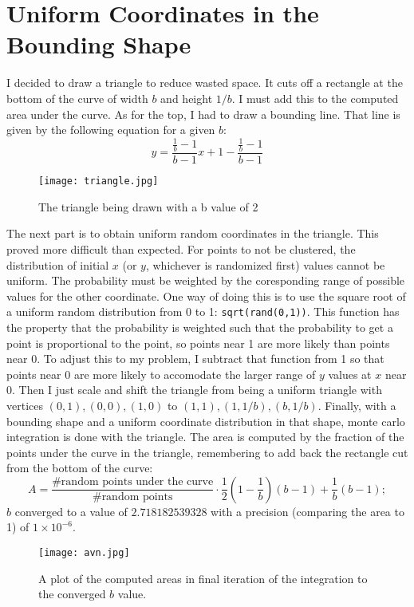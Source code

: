 \documentclass{article}
\begin{document}
\section*{Uniform Coordinates in the Bounding Shape}
I decided to draw a triangle to reduce wasted space. It cuts off a rectangle at the bottom of the curve of width $b$ and height $1/b$. I must add this to the computed area under the curve.
As for the top, I had to draw a bounding line. That line is given by the following equation for a given $b$:\begin{equation}
    y=\frac{\frac{1}{b}-1}{b-1}x+1-\frac{\frac{1}{b}-1}{b-1}
\end{equation}
\begin{figure}[H]
    \centering
    \texttt{[image: triangle.jpg]}
    \caption{The triangle being drawn with a b value of 2}
\end{figure}
The next part is to obtain uniform random coordinates in the triangle. This proved more difficult than expected. For points to not be clustered, the distribution of initial $x$ (or $y$, whichever is randomized first) values cannot be uniform. The probability must be weighted by the coresponding range of possible values for the other coordinate. One way of doing this is to use the square root of a uniform random distribution from 0 to 1: \verb+sqrt(rand(0,1))+. This function has the property that the probability is weighted such that the probability to get a point is proportional to the point, so points near 1 are more likely than points near 0. To adjust this to my problem, I subtract that function from 1 so that points near 0 are more likely to accomodate the larger range of $y$ values at $x$ near 0. Then I just scale and shift the triangle from being a uniform triangle with vertices $(0,1),(0,0),(1,0)$ to $(1,1),(1,1/b),(b,1/b)$. Finally, with a bounding shape and a uniform coordinate distribution in that shape, monte carlo integration is done with the triangle. The area is computed by the fraction of the points under the curve in the triangle, remembering to add back the rectangle cut from the bottom of the curve:\begin{equation}
    A=\frac{\text{\# random points under the curve}}{\text{\# random points}}\cdot \frac{1}{2}(1-\frac{1}{b})(b-1)+\frac{1}{b}(b-1);
\end{equation}
$b$ converged to a value of $2.718182539328$ with a precision (comparing the area to 1) of $1\times10^{-6}$. 
\begin{figure}[H]
    \centering
    \texttt{[image: avn.jpg]}
    \caption{A plot of the computed areas in final iteration of the integration to the converged $b$ value.}
\end{figure}
\end{document}
